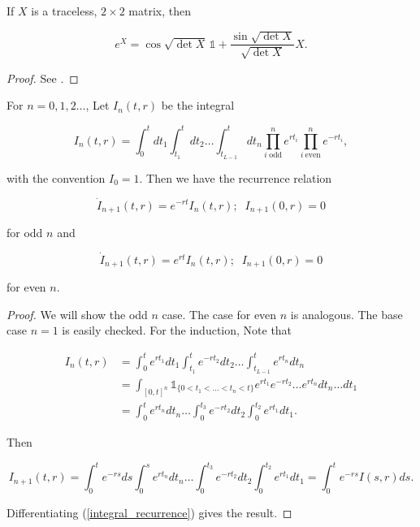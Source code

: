\begin{proposition}\label{mat-exp-lemma}
If $X$ is a traceless, $2 \times 2$ matrix, then

  $$ e^X = \cos \sqrt{\det X}\,\mathds{1} + \frac{\sin \sqrt{\det X}}{\sqrt{\det X}}X.$$
\end{proposition}
\begin{proof}
See \cite[\S 1.2]{WulfLiegroups}.
\end{proof}

\begin{proposition}\label{recursion-lemma}
  For $n = 0, 1 ,2 \ldots$, Let $I_n(t,r)$ be the integral

  \begin{equation}
    I_n(t,r)= \int_0^t dt_1\int_{t_1}^t dt_2\ldots \int_{t_{L-1}}^t dt_n \prod_{i \; \text{odd}}^n e^{rt_i} \prod_{i \: \text{even}}^n e^{-rt_i},
  \end{equation}

  with the convention $I_0 = 1$. Then we have the recurrence relation

  \begin{equation}\label{differential_recurrence_odd_proof}
    \dot{I}_{n+1}(t,r) = e^{-rt}  I_n(t,r); \; \; I_{n+1}(0,r) = 0
  \end{equation}

  for odd $n$ and

  \begin{equation}\label{differential_recurrence_even_proof}
    \dot{I}_{n+1}(t,r) = e^{rt}  I_n(t,r); \; \; I_{n+1}(0,r) = 0
  \end{equation}

  for even $n$.

\end{proposition}
\begin{proof}
We will show the odd $n$ case. The case for even $n$ is analogous. The base case $n=1$ is easily checked. For the induction, Note that

\begin{align}
  I_n(t,r) &= \int_0^t e^{rt_1}dt_1\int_{t_1}^t e^{-rt_2}dt_2\ldots \int_{t_{L-1}}^t e^{rt_n}dt_n \\
  &= \int_{[0,t]^n} \mathds{1}_{\{0 < t_1 < \ldots < t_n < t\}}e^{rt_1}e^{-rt_2}\ldots e^{rt_n} dt_n\ldots dt_1 \\
  &= \int^t_0 e^{rt_n} dt_n \ldots \int_0^{t_3}e^{-rt_2}dt_2\int_0^{t_2}e^{rt_1}dt_1.
\end{align}

Then

\begin{equation}\label{integral_recurrence}
  I_{n+1}(t,r) = \int_0^t e^{-rs} ds \int_0^s e^{rt_n} dt_n \ldots \int_0^{t_3}e^{-rt_2}dt_2\int_0^{t_2}e^{rt_1}dt_1 = \int_0^t e^{-rs} I(s,r)ds.
\end{equation}

Differentiating (\ref{integral_recurrence}) gives the result.
\end{proof}

